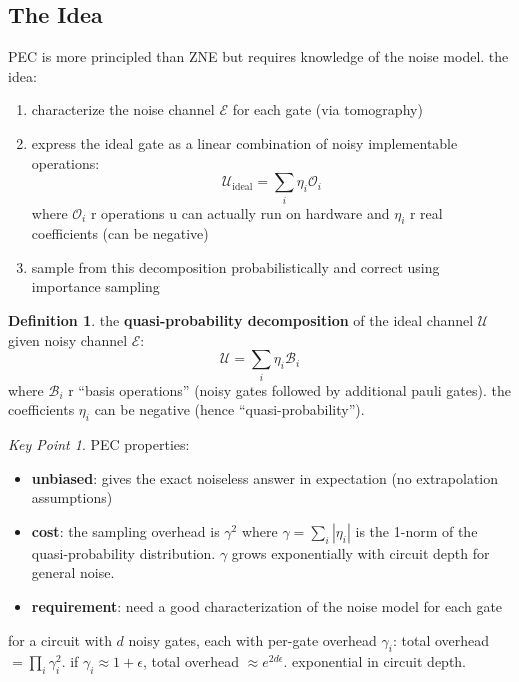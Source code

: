 \documentclass[11pt,a4paper]{article}
\theoremstyle{definition}
\newtheorem{definition}{Definition}[section]
\theoremstyle{remark}
\newtheorem*{keypoint}{Key Point}
\begin{document}
\subsection{The Idea}

PEC is more principled than ZNE but requires knowledge of the noise model. the idea:

\begin{enumerate}
    \item characterize the noise channel $\mathcal{E}$ for each gate (via tomography)
    \item express the ideal gate as a linear combination of noisy implementable operations:
    \[
    \mathcal{U}_{\text{ideal}} = \sum_i \eta_i \mathcal{O}_i
    \]
    where $\mathcal{O}_i$ r operations u can actually run on hardware and $\eta_i$ r real coefficients (can be negative)
    \item sample from this decomposition probabilistically and correct using importance sampling
\end{enumerate}

\begin{definition}
the \textbf{quasi-probability decomposition} of the ideal channel $\mathcal{U}$ given noisy channel $\mathcal{E}$:
\[
\mathcal{U} = \sum_i \eta_i \mathcal{B}_i
\]
where $\mathcal{B}_i$ r ``basis operations'' (noisy gates followed by additional pauli gates). the coefficients $\eta_i$ can be negative (hence ``quasi-probability'').
\end{definition}

\begin{keypoint}
PEC properties:
\begin{itemize}
    \item \textbf{unbiased}: gives the exact noiseless answer in expectation (no extrapolation assumptions)
    \item \textbf{cost}: the sampling overhead is $\gamma^2$ where $\gamma = \sum_i |\eta_i|$ is the 1-norm of the quasi-probability distribution. $\gamma$ grows exponentially with circuit depth for general noise.
    \item \textbf{requirement}: need a good characterization of the noise model for each gate
\end{itemize}
for a circuit with $d$ noisy gates, each with per-gate overhead $\gamma_i$: total overhead $= \prod_i \gamma_i^2$. if $\gamma_i \approx 1 + \epsilon$, total overhead $\approx e^{2d\epsilon}$. exponential in circuit depth.
\end{keypoint}
\end{document}

